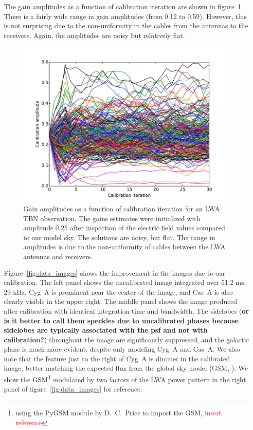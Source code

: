 \documentclass[a4paper,fleqn,usenatbib]{../mnras}
\begin{document}
The gain amplitudes as a function of calibration iteration are shown in figure~\ref{fig:data_amp}. There is a fairly wide range in gain amplitudes (from 0.12 to 0.59). However, this is not surprising due to the non-uniformity in the cables from the antennas to the receivers. Again, the amplitudes are noisy but relatively flat.

\begin{figure}
\begin{center}
\includegraphics[width=\columnwidth]{figures/cal_paper_data_amps.pdf}
\caption{Gain amplitudes as a function of calibration iteration for an LWA TBN observation. The gains estimates were initialized with amplitude 0.25 after inspection of the electric field values compared to our model sky. The solutions are noisy, but flat. The range in amplitudes is due to the non-uniformity of cables between the LWA antennas and receivers.
}
\label{fig:data_amp}
\end{center}
\end{figure}

Figure~\ref{fig:data_images} shows the improvement in the images due to our calibration. The left panel shows the uncalibrated image integrated over 51.2 ms, 29 kHz. Cyg~A is prominent near the center of the image, and Cas~A is also clearly visible in the upper right. The middle panel shows the image produced after calibration with identical integration time and bandwidth. The sidelobes ({\bf or is it better to call them speckles due to uncalibrated phases because sidelobes are typically associated with the psf and not with calibration?}) throughout the image are significantly suppressed, and the galactic plane is much more evident, despite only modeling Cyg~A and Cas~A. We also note that the feature just to the right of Cyg~A is dimmer in the calibrated image, better matching the expected flux from the global sky model (GSM, \citealt{deo08}). We show the GSM\footnote{using the PyGSM module by D.~C.~Price to import the GSM, \textcolor{red}{insert reference}} modulated by two factors of the LWA power pattern in the right panel of figure~\ref{fig:data_images} for reference.
\end{document}

